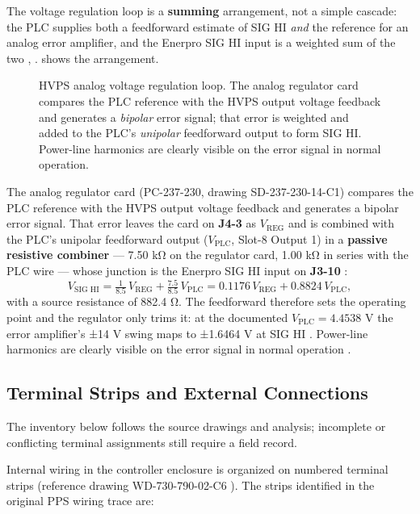 The voltage regulation loop is a \textbf{summing} arrangement, not a simple cascade: the PLC supplies both a feedforward estimate of SIG HI \emph{and} the reference for an analog error amplifier, and the Enerpro SIG HI input is a weighted sum of the two , .  shows the arrangement.

\begin{figure}[tbp]\centering
\begin{fitpicture}\end{fitpicture}
\caption{HVPS analog voltage regulation loop.  The analog regulator card
  compares the PLC reference with the HVPS output voltage feedback and
  generates a \emph{bipolar} error signal; that error is weighted and added to
  the PLC's \emph{unipolar} feedforward output to form SIG HI.  Power-line
  harmonics are clearly visible on the error signal in normal
  operation.}\label{fig:regulation-loop}
\end{figure}

The analog regulator card (PC-237-230, drawing SD-237-230-14-C1) compares the PLC reference with the HVPS output voltage feedback and generates a bipolar error signal. That error leaves the card on \textbf{J4-3} as $V_\text{REG}$ and is combined with the PLC's unipolar feedforward output ($V_\text{PLC}$, Slot-8 Output 1) in a \textbf{passive resistive combiner} --- 7.50 kΩ on the regulator card, 1.00 kΩ in series with the PLC wire --- whose junction is the Enerpro SIG HI input on \textbf{J3-10} :
\[
  V_\text{SIG HI} = \tfrac{1}{8.5}\,V_\text{REG} + \tfrac{7.5}{8.5}\,V_\text{PLC}
               = 0.1176\,V_\text{REG} + 0.8824\,V_\text{PLC},
\]
with a source resistance of 882.4 Ω. The feedforward therefore sets the operating point and the regulator only trims it: at the documented $V_\text{PLC}=4.4538$ V the error amplifier's ±14 V swing maps to ±1.6464 V at SIG HI . Power-line harmonics are clearly visible on the error signal in normal operation .


\subsection{Terminal Strips and External Connections}\label{sec:terminal-strips}

The inventory below follows the source drawings and analysis; incomplete or conflicting terminal assignments still require a field record.

Internal wiring in the controller enclosure is organized on numbered terminal strips (reference drawing WD-730-790-02-C6 ). The strips identified in the original PPS wiring trace  are:

